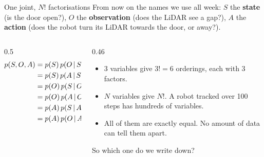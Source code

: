 \documentclass[10pt, aspectratio=169]{beamer}
\begin{document}
\begin{frame}{One joint, $N!$ factorisations}
  From now on the names we use all week: $S$ the \textbf{state} (is the door open?),
  $O$ the \textbf{observation} (does the LiDAR see a gap?), $A$ the \textbf{action} (does the
  robot turn its LiDAR towards the door, or away?).
  \vspace{0.3em}
  \begin{columns}[c]
    \begin{column}{0.5\textwidth}
      \small
      \begin{align*}
        p(S,O,A) &= p(S)\,p(O\,|\, S)\,p(A\,|\, S,O)\\
                 &= p(S)\,p(A\,|\, S)\,p(O\,|\, S,A)\\
                 &= p(O)\,p(S\,|\, O)\,p(A\,|\, S,O)\\
                 &= p(O)\,p(A\,|\, O)\,p(S\,|\, O,A)\\
                 &= p(A)\,p(S\,|\, A)\,p(O\,|\, S,A)\\
                 &= p(A)\,p(O\,|\, A)\,p(S\,|\, O,A)
      \end{align*}
    \end{column}
    \begin{column}{0.46\textwidth}
      \begin{itemize}
        \item 3 variables give $3! = 6$ orderings, each with 3 factors.
        \item $N$ variables give $N!$. A robot tracked over 100 steps has hundreds of
              variables.
        \item All of them are \alert{exactly equal}. No amount of data can tell them apart.
      \end{itemize}
      \vspace{0.3em}
      So which one do we write down?
    \end{column}
  \end{columns}
\end{frame}
\end{document}
